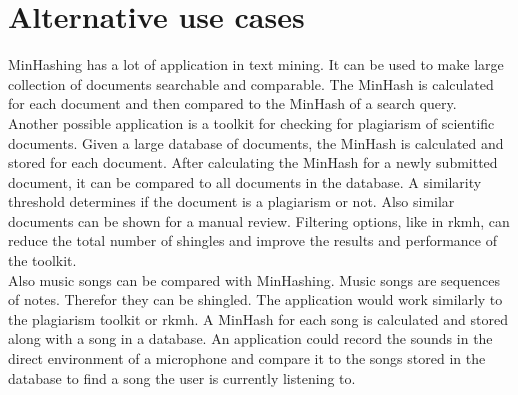 \section{Alternative use cases}

MinHashing has a lot of application in text mining. It can be used to make large collection of documents searchable and comparable. The MinHash is calculated for each document and then compared to the MinHash of a search query.\\

Another possible application is a toolkit for checking for plagiarism of scientific documents. Given a large database of documents, the MinHash is calculated and stored for each document. After calculating the MinHash for a newly submitted document, it can be compared to all documents in the database. A similarity threshold determines if the document is a plagiarism or not. Also similar documents can be shown for a manual review. Filtering options, like in rkmh, can reduce the total number of shingles and improve the results and performance of the toolkit.\\

Also music songs can be compared with MinHashing. Music songs are sequences of notes. Therefor they can be shingled. The application would work similarly to the plagiarism toolkit or rkmh. A MinHash for each song is calculated and stored along with a song in a database. An application could record the sounds in the direct environment of a microphone and compare it to the songs stored in the database to find a song the user is currently listening to.\\